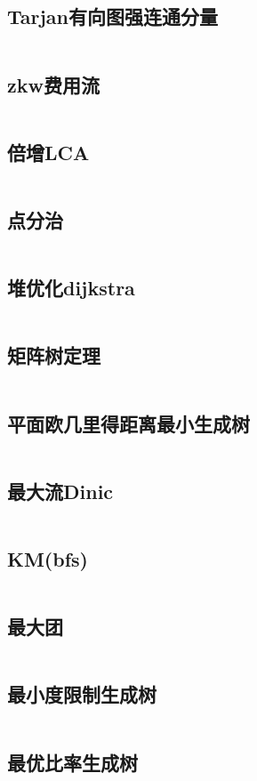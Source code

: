 \documentclass[UTF8]{ctexart}
\begin{document}
\subsection{Tarjan有向图强连通分量}
\inputminted{cpp}{graphtheory/Tarjan有向图强连通分量.cpp}
\subsection{zkw费用流}
\inputminted{cpp}{graphtheory/zkw费用流.cpp}
\subsection{倍增LCA}
\inputminted{cpp}{graphtheory/倍增LCA.cpp}
\subsection{点分治}
\inputminted{cpp}{graphtheory/点分治.cpp}
\subsection{堆优化dijkstra}
\inputminted{cpp}{graphtheory/堆优化dijkstra.cpp}
\subsection{矩阵树定理}
\inputminted{cpp}{graphtheory/矩阵树定理.cpp}
\subsection{平面欧几里得距离最小生成树}
\inputminted{cpp}{graphtheory/平面欧几里得距离最小生成树.cpp}
\subsection{最大流Dinic}
\inputminted{cpp}{graphtheory/最大流Dinic.cpp}
\subsection{KM(bfs)}
\inputminted{cpp}{graphtheory/KM_bfs.cpp}
\subsection{最大团}
\inputminted{cpp}{graphtheory/最大团.cpp}
\subsection{最小度限制生成树}
\inputminted{cpp}{graphtheory/最小度限制生成树.cpp}
\subsection{最优比率生成树}
\inputminted{cpp}{graphtheory/最优比率生成树.cpp}
\end{document}
